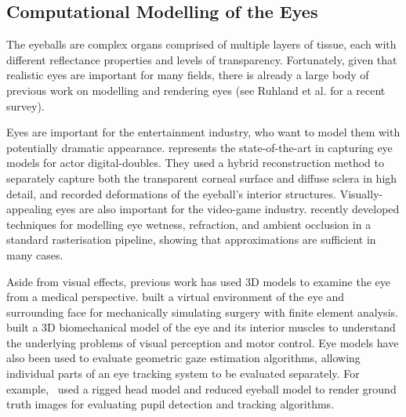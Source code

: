 
\subsection{Computational Modelling of the Eyes}



The eyeballs are complex organs comprised of multiple layers of tissue, each with different reflectance properties and levels of transparency.
Fortunately, given that realistic eyes are important for many fields, there is already a large body of previous work on modelling and rendering eyes (see Ruhland et al. \cite{ruhland2014look} for a recent survey).


Eyes are important for the entertainment industry, who want to model them with potentially dramatic appearance. \citet{berard2014highquality} represents the state-of-the-art in capturing eye models for actor digital-doubles.
They used a hybrid reconstruction method to separately capture both the transparent corneal surface and diffuse sclera in high detail, and recorded deformations of the eyeball's interior structures. Visually-appealing eyes are also important for the video-game industry. \mbox{\citet{ActiBlizEyes}} recently developed techniques for modelling eye wetness, refraction, and ambient occlusion in a standard rasterisation pipeline, showing that approximations are sufficient in many cases.

Aside from visual effects, previous work has used 3D models to examine the eye from a medical perspective.
\citet{sagar1994virtual} built a virtual environment of the eye and surrounding face for mechanically simulating surgery with finite element analysis.
\citet{priamikov14_openeyesim} built a 3D biomechanical model of the eye and its interior muscles to understand the underlying problems of visual perception and motor control.
Eye models have also been used to evaluate geometric gaze estimation algorithms, allowing individual parts of an eye tracking system to be evaluated separately.
For example,~\citet{swirski2014rendering} used a rigged head model and reduced eyeball model to render ground truth images for evaluating pupil detection and tracking algorithms.

